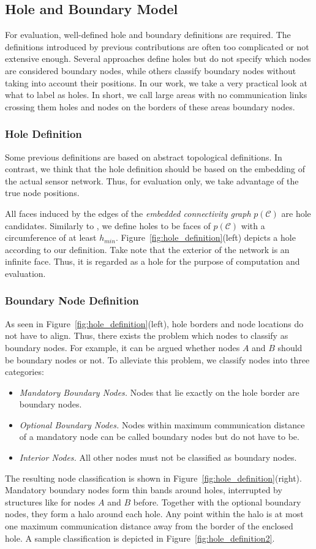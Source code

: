 \documentclass{llncs}
\newcommand{\cC}{\mathcal C}
\begin{document}
\subsection{Hole and Boundary Model}
For evaluation, well-defined hole and boundary definitions are required.
The definitions introduced by previous contributions are often too complicated or not extensive enough.
Several approaches define holes but do not specify which nodes are considered boundary nodes, while others classify boundary nodes without taking into account their positions.
In our work, we take a very practical look at what to label as holes.
In short, we call large areas with no communication links crossing them holes and nodes on the borders of these areas boundary nodes.

\subsubsection{Hole Definition}
Some previous definitions are based on abstract topological definitions.
In contrast, we think that the hole definition should be based on the embedding of the actual sensor network.
Thus, for evaluation only, we take advantage of the true node positions.

All faces induced by the edges of the \emph{embedded connectivity graph} $p(\cC)$ are hole candidates.
Similarly to \cite{kfpf-dbrte-06}, we define holes to be faces of $p(\cC)$ with a circumference of at least $h_{min}$.
Figure~\ref{fig:hole_definition}(left) depicts a hole according to our definition.
Take note that the exterior of the network is an infinite face.
Thus, it is regarded as a hole for the purpose of computation and evaluation.

\subsubsection{Boundary Node Definition}
As seen in Figure~\ref{fig:hole_definition}(left), hole borders and node locations do not have to align.
Thus, there exists the problem which nodes to classify as boundary nodes.
For example, it can be argued whether nodes $A$ and $B$ should be boundary nodes or not.
To alleviate this problem, we classify nodes into three categories:
\begin{itemize}
	\item \emph{Mandatory Boundary Nodes.} Nodes that lie exactly on the hole border are boundary nodes.
	\item \emph{Optional Boundary Nodes.} Nodes within maximum communication distance of a mandatory node can be called boundary nodes but do not have to be.
	\item \emph{Interior Nodes.} All other nodes must not be classified as boundary nodes.
\end{itemize}
The resulting node classification is shown in Figure~\ref{fig:hole_definition}(right).
Mandatory boundary nodes form thin bands around holes, interrupted by structures like for nodes $A$ and $B$ before.
Together with the optional boundary nodes, they form a halo around each hole.
Any point within the halo is at most one maximum communication distance away from the border of the enclosed hole.
A sample classification is depicted in Figure~\ref{fig:hole_definition2}.
\end{document}
